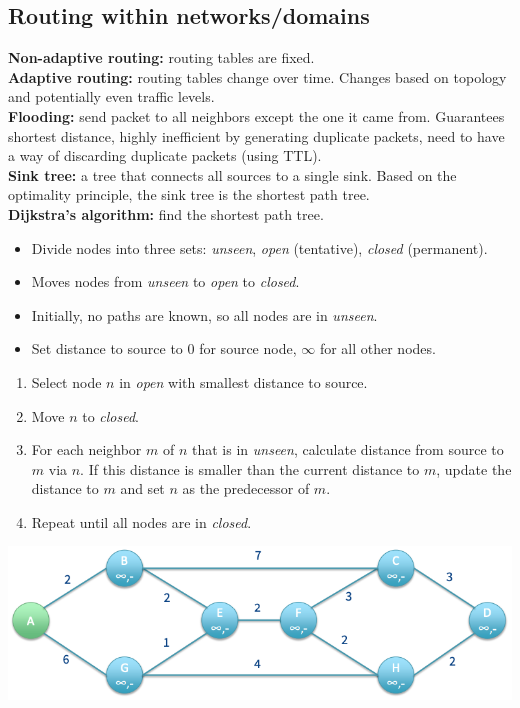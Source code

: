 \subsection{Routing within networks/domains}
\textbf{Non-adaptive routing:} routing tables are fixed.\\
\textbf{Adaptive routing:} routing tables change over time. Changes based on topology and potentially even traffic levels.\\
\textbf{Flooding:} send packet to all neighbors except the one it came from. Guarantees shortest distance, highly inefficient by generating duplicate packets, need to have a way of discarding duplicate packets (using TTL).\\
\textbf{Sink tree:} a tree that connects all sources to a single sink. Based on the optimality principle, the sink tree is the shortest path tree.\\
\textbf{Dijkstra's algorithm:} find the shortest path tree.\\
\begin{itemize}
    \item Divide nodes into three sets: \textit{unseen}, \textit{open} (tentative), \textit{closed} (permanent).
    \item Moves nodes from \textit{unseen} to \textit{open} to \textit{closed}.
    \item Initially, no paths are known, so all nodes are in \textit{unseen}.
    \item Set distance to source to 0 for source node, $\infty$ for all other nodes.
\end{itemize}
\begin{enumerate}
    \item Select node $n$ in \textit{open} with smallest distance to source.
    \item Move $n$ to \textit{closed}.
    \item For each neighbor $m$ of $n$ that is in \textit{unseen}, calculate distance from source to $m$ via $n$. If this distance is smaller than the current distance to $m$, update the distance to $m$ and set $n$ as the predecessor of $m$.
    \item Repeat until all nodes are in \textit{closed}.
\end{enumerate}
\includegraphics[width=\linewidth]{figs/dijkstra-example-1.png}\\
